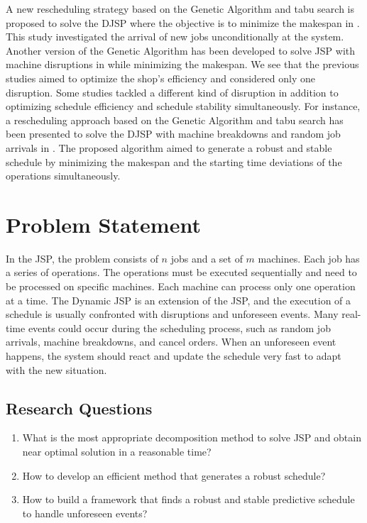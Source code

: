 \documentclass{article}
\begin{document}
A new rescheduling strategy based on the Genetic Algorithm and tabu search is proposed to solve the DJSP where the objective is to minimize the makespan in \cite{ali2019adopted}. This study investigated the arrival of new jobs unconditionally at the system. Another version of the Genetic Algorithm has been developed to solve JSP with machine disruptions in \cite{wang2013novel} while minimizing the makespan. We see that the previous studies aimed to optimize the shop's efficiency and considered only one disruption. Some studies tackled a different kind of disruption in addition to optimizing schedule efficiency and schedule stability simultaneously. For instance, a rescheduling approach based on the Genetic Algorithm and tabu search has been presented to solve the DJSP with machine breakdowns and random job arrivals in \cite{zhang2013hybrid}. The proposed algorithm aimed to generate a robust and stable schedule by minimizing the makespan and the starting time deviations of the operations simultaneously. 

\section{Problem Statement}
In the JSP, the problem consists of $n$ jobs and a set of $m$ machines. Each job has a series of operations. The operations must be executed sequentially and need to be processed on specific machines. Each machine can process only one operation at a time. The Dynamic JSP is an extension of the JSP, and the execution of a schedule is usually confronted with disruptions and unforeseen events. Many real-time events could occur during the scheduling process, such as random job arrivals, machine breakdowns, and cancel orders. When an unforeseen event happens, the system should react and update the schedule very fast to adapt with the new situation.
\subsection{Research Questions}
\begin{enumerate}
    \item What is the most appropriate decomposition method to solve JSP and obtain near optimal solution in a reasonable time?
    \item How to develop an efficient method that generates a robust schedule?
    \item How to build a framework that finds a robust and stable predictive schedule to handle unforeseen events?
\end{enumerate}
\end{document}
